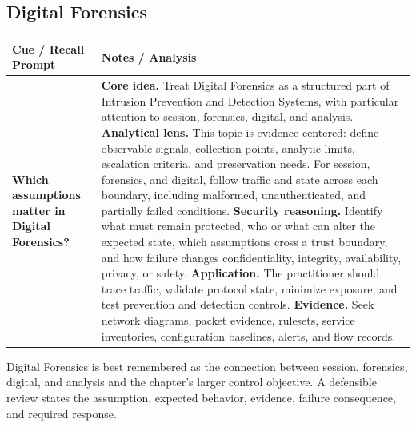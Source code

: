 \documentclass[11pt]{article}
\newcommand{\CornellHeader}{%
\rowcolor{Navy}\color{white}\bfseries Cue / Recall Prompt & \color{white}\bfseries Notes / Analysis\\\hline}
\newcommand{\CornellRow}[2]{%
\cellcolor{CueGray}\RaggedRight\textbf{#1} & \RaggedRight #2\\\hline}
\begin{document}
\subsection*{Digital Forensics}
\begin{longtable}{>{\RaggedRight\arraybackslash}p{}|>{\RaggedRight\arraybackslash}p{}}
\CornellHeader
\CornellRow{Which assumptions matter in Digital Forensics?}{\textbf{Core idea.} Treat Digital Forensics as a structured part of Intrusion Prevention and Detection Systems, with particular attention to session, forensics, digital, and analysis. \textbf{Analytical lens.} This topic is evidence-centered: define observable signals, collection points, analytic limits, escalation criteria, and preservation needs. For session, forensics, and digital, follow traffic and state across each boundary, including malformed, unauthenticated, and partially failed conditions. \textbf{Security reasoning.} Identify what must remain protected, who or what can alter the expected state, which assumptions cross a trust boundary, and how failure changes confidentiality, integrity, availability, privacy, or safety. \textbf{Application.} The practitioner should trace traffic, validate protocol state, minimize exposure, and test prevention and detection controls. \textbf{Evidence.} Seek network diagrams, packet evidence, rulesets, service inventories, configuration baselines, alerts, and flow records.}
\end{longtable}
\begin{topicsummary}
Digital Forensics is best remembered as the connection between session, forensics, digital, and analysis and the chapter's larger control objective. A defensible review states the assumption, expected behavior, evidence, failure consequence, and required response.
\end{topicsummary}
\end{document}
